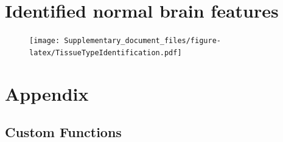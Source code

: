 \documentclass[]{article}
\begin{document}
\section{Identified normal brain features}
\begin{figure}[H]
\begin{center}
\texttt{[image: Supplementary\_document\_files/figure-latex/TissueTypeIdentification.pdf]}
\label{fig:ion.tab}
\end{center}
\end{figure}


\section{Appendix}\label{appendix}

\subsection{Custom Functions}\label{custom-functions}
\end{document}

